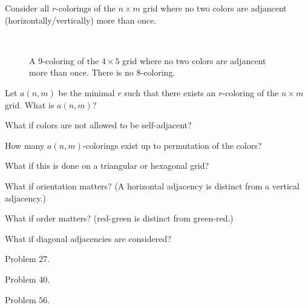 \documentclass{article}
\begin{document}
  Consider all $r$-colorings of the $n \times m$ grid where no two colors
  are adjancent (horizontally/vertically) more than once.

\begin{figure}[!h]
  \centering
  \\
  \caption{A $9$-coloring of the $4 \times 5$ grid where no two colors are adjancent
    more than once. There is no $8$-coloring.}
\end{figure}

\begin{question}
  Let $a(n, m)$ be the minimal $r$ such that there exists an $r$-coloring of the
  $n \times m$ grid. What is $a(n, m)$?
\end{question}
\begin{related}
  \item What if colors are not allowed to be self-adjacent?
  \item How many $a(n, m)$-colorings exist up to permutation of the colors?
  \item What if this is done on a triangular or hexagonal grid?
  \item What if orientation matters?
    (A horizontal adjacency is distinct from a vertical adjacency.)
  \item What if order matters? (red-green is distinct from green-red.)
  \item What if diagonal adjacencies are considered?
\end{related}

\begin{references}
  \item Problem 27.
  \item Problem 40.
  \item Problem 56.
\end{references}
\end{document}

